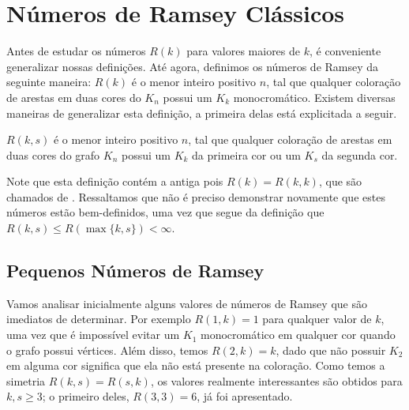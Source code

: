 
\chapter{Números de Ramsey Clássicos}
\label{chap:prelim}


Antes de estudar os números $R(k)$ para valores maiores de $k$, é conveniente generalizar nossas definições. Até agora, definimos os números de Ramsey da seguinte maneira: $R(k)$ é o menor inteiro positivo $n$, tal que qualquer coloração de arestas em duas cores do $K_n$ possui um $K_k$ monocromático. Existem diversas maneiras de generalizar esta definição, a primeira delas está explicitada a seguir.

\begin{definition}
$R(k,s)$ é o menor inteiro positivo $n$, tal que qualquer coloração de arestas em duas cores do grafo $K_n$ possui um $K_k$ da primeira cor ou um $K_s$ da segunda cor.
\end{definition}

Note que esta definição contém a antiga pois $R(k) = R(k,k)$, que são chamados de . Ressaltamos que não é preciso demonstrar novamente que estes números estão bem-definidos, uma vez que segue da definição que $R(k,s) \leq R(\max\{k,s\}) < \infty$.


\section{Pequenos Números de Ramsey}

Vamos analisar inicialmente alguns valores de números de Ramsey que são imediatos de determinar. Por exemplo $R(1,k) = 1$ para qualquer valor de $k$, uma vez que é impossível evitar um $K_1$ monocromático em qualquer cor quando o grafo possui vértices. Além disso, temos $R(2,k) = k$, dado que não possuir $K_2$ em alguma cor significa que ela não está presente na coloração. Como temos a simetria $R(k,s) = R(s,k)$, os valores realmente interessantes são obtidos para $k,s \geq 3$; o primeiro deles, $R(3,3) = 6$, já foi apresentado.

